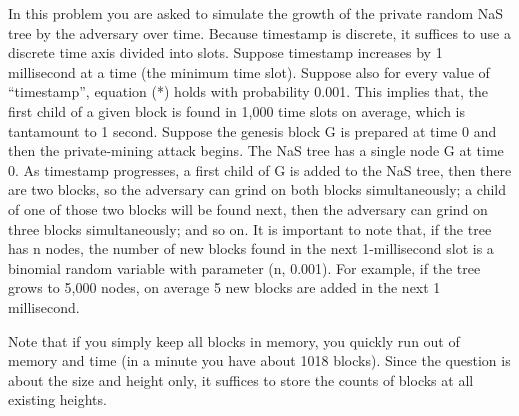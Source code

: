 \documentclass{article}
\begin{document}
In this problem you are asked to simulate the growth of the private random NaS tree by the adversary over time.  Because timestamp is discrete, it suffices to use a discrete time axis divided into slots.  Suppose timestamp increases by 1 millisecond at a time (the minimum time slot).  Suppose also for every value of ``timestamp'', equation (*) holds with probability 0.001.  This implies that, the first child of a given block is found in 1,000 time slots on average, which is tantamount to 1 second.  Suppose the genesis block G is prepared at time 0 and then the private-mining attack begins.  The NaS tree has a single node G at time 0.  As timestamp progresses, a first child of G is added to the NaS tree, then there are two blocks, so the adversary can grind on both blocks simultaneously; a child of one of those two blocks will be found next, then the adversary can grind on three blocks simultaneously; and so on.  It is important to note that, if the tree has n nodes, the number of new blocks found in the next 1-millisecond slot is a binomial random variable with parameter (n, 0.001).  For example, if the tree grows to 5,000 nodes, on average 5 new blocks are added in the next 1 millisecond.

Note that if you simply keep all blocks in memory, you quickly run out of memory and time (in a minute you have about 1018 blocks).  Since the question is about the size and height only, it suffices to store the counts of blocks at all existing heights.
 
\end{document}
